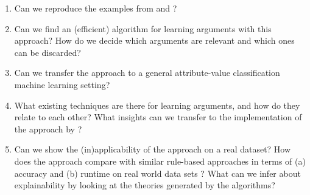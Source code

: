 \begin{enumerate}
    \item Can we reproduce the examples from \cite{verheijProofProbabilities2017} and \cite{verheijAnalyzingSimonshavenCase2020}?
    \item Can we find an (efficient) algorithm for learning arguments with this approach? How do we decide which arguments are relevant and which ones can be discarded?
    \item Can we transfer the approach to a general attribute-value classification machine learning setting?
    \item What existing techniques are there for learning arguments, and how do they relate to each other? What insights can we transfer to the implementation of the approach by \cite{verheijProofProbabilities2017}?
    \item Can we show the (in)applicability of the approach on a real dataset? How does the approach compare with similar rule-based approaches in terms of (a) accuracy and (b) runtime on %
    real world data sets 
    ?
    What can we infer about explainability by looking at the theories generated by the algorithms?
\end{enumerate}
